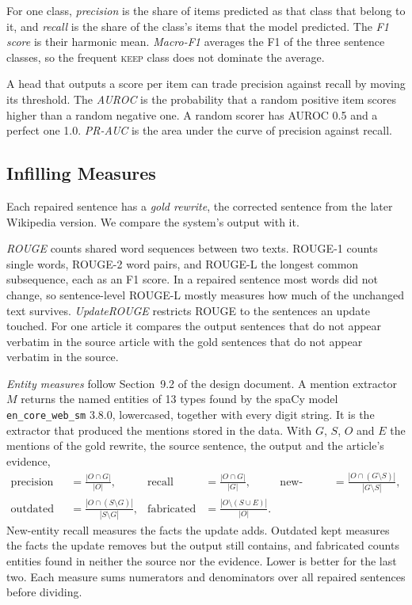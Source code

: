 \documentclass[]{paper}
\newcommand{\keep}{\textsc{keep}}
\begin{document}
For one class, \emph{precision} is the share of items predicted as that class that belong to it, and \emph{recall} is the share of the class's items that the model predicted. The \emph{F1 score} is their harmonic mean. \emph{Macro-F1} averages the F1 of the three sentence classes, so the frequent \keep{} class does not dominate the average.

A head that outputs a score per item can trade precision against recall by moving its threshold. The \emph{AUROC} is the probability that a random positive item scores higher than a random negative one. A random scorer has AUROC 0.5 and a perfect one 1.0. \emph{PR-AUC} is the area under the curve of precision against recall.

\subsection{Infilling Measures}

Each repaired sentence has a \emph{gold rewrite}, the corrected sentence from the later Wikipedia version. We compare the system's output with it.

\emph{ROUGE} \citep{lin-2004-rouge} counts shared word sequences between two texts. ROUGE-1 counts single words, ROUGE-2 word pairs, and ROUGE-L the longest common subsequence, each as an F1 score. In a repaired sentence most words did not change, so sentence-level ROUGE-L mostly measures how much of the unchanged text survives. \emph{UpdateROUGE} \citep{iv-etal-2022-fruit} restricts ROUGE to the sentences an update touched. For one article it compares the output sentences that do not appear verbatim in the source article with the gold sentences that do not appear verbatim in the source.

\emph{Entity measures} follow Section~9.2 of the design document. A mention extractor $M$ returns the named entities of 13 types found by the spaCy model \texttt{en\_core\_web\_sm} 3.8.0, lowercased, together with every digit string. It is the extractor that produced the mentions stored in the data. With $G$, $S$, $O$ and $E$ the mentions of the gold rewrite, the source sentence, the output and the article's evidence,
\begin{align*}
\text{precision} &= \frac{|O \cap G|}{|O|}, &
\text{recall} &= \frac{|O \cap G|}{|G|}, &
\text{new-entity recall} &= \frac{|O \cap (G \setminus S)|}{|G \setminus S|}, \\
\text{outdated kept} &= \frac{|O \cap (S \setminus G)|}{|S \setminus G|}, &
\text{fabricated} &= \frac{|O \setminus (S \cup E)|}{|O|}.
\end{align*}
New-entity recall measures the facts the update adds. Outdated kept measures the facts the update removes but the output still contains, and fabricated counts entities found in neither the source nor the evidence. Lower is better for the last two. Each measure sums numerators and denominators over all repaired sentences before dividing.
\end{document}
